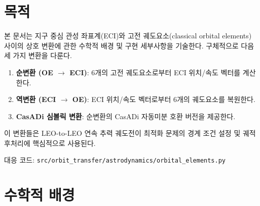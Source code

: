 \documentclass[11pt]{article}
\begin{document}
\drawborder
\thispagestyle{firstpage}

\def\lighterdate{February 12, 2026}

\begin{abstract}
본 문서는 지구 중심 관성 좌표계(ECI)와 고전 궤도요소(classical orbital elements) 사이의 상호 변환에 관한 수학적 배경 및 구현 세부사항을 기술한다.
순변환(OE $\to$ ECI), 역변환(ECI $\to$ OE), CasADi 심볼릭 변환의 세 가지 변환을 다루며,
이들은 LEO-to-LEO 연속 추력 궤도전이 최적화 문제의 경계 조건 설정 및 궤적 후처리에 핵심적으로 사용된다.
\end{abstract}

\section{목적}

본 문서는 지구 중심 관성 좌표계(ECI)와 고전 궤도요소(classical orbital elements) 사이의 상호 변환에 관한 수학적 배경 및 구현 세부사항을 기술한다. 구체적으로 다음 세 가지 변환을 다룬다.

\begin{enumerate}
  \item \textbf{순변환 (OE $\to$ ECI)}: 6개의 고전 궤도요소로부터 ECI 위치/속도 벡터를 계산한다.
  \item \textbf{역변환 (ECI $\to$ OE)}: ECI 위치/속도 벡터로부터 6개의 궤도요소를 복원한다.
  \item \textbf{CasADi 심볼릭 변환}: 순변환의 CasADi 자동미분 호환 버전을 제공한다.
\end{enumerate}

이 변환들은 LEO-to-LEO 연속 추력 궤도전이 최적화 문제의 경계 조건 설정 및 궤적 후처리에 핵심적으로 사용된다.

대응 코드: \texttt{src/orbit\_transfer/astrodynamics/orbital\_elements.py}

\section{수학적 배경}
\end{document}
